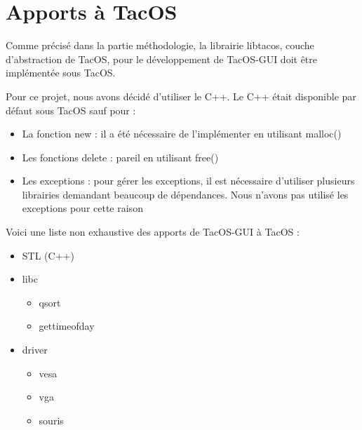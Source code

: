 \section{Apports à TacOS}

Comme précisé dans la partie méthodologie, la librairie libtacos, couche d'abstraction de TacOS, pour le développement de TacOS-GUI doit être implémentée sous TacOS.

Pour ce projet, nous avons décidé d'utiliser le C++.
Le C++ était disponible par défaut sous TacOS sauf pour :

\begin{itemize}
  \item La fonction new : il a été nécessaire de l'implémenter en utilisant malloc()
  \item Les fonctions delete : pareil en utilisant free()
  \item Les exceptions : pour gérer les exceptions, il est nécessaire d'utiliser plusieurs librairies demandant beaucoup de dépendances. Nous n'avons pas utilisé les exceptions pour cette raison
\end{itemize}

Voici une liste non exhaustive des apports de TacOS-GUI à TacOS :
  
\begin{itemize}
  \item STL (C++)
  \item libc
    \begin{itemize}
      \item qsort
      \item gettimeofday
    \end{itemize}
  \item driver
    \begin{itemize}
      \item vesa
      \item vga
      \item souris
    \end{itemize}
\end{itemize}

